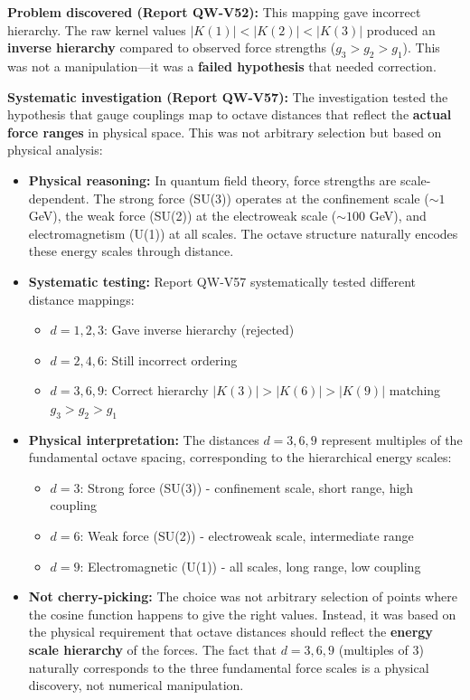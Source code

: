 \documentclass[11pt, a4paper]{article}
\begin{document}
\textbf{Problem discovered (Report QW-V52):} This mapping gave incorrect hierarchy. The raw kernel values $|K(1)| < |K(2)| < |K(3)|$ produced an \textbf{inverse hierarchy} compared to observed force strengths ($g_3 > g_2 > g_1$). This was not a manipulation—it was a \textbf{failed hypothesis} that needed correction.

\textbf{Systematic investigation (Report QW-V57):} The investigation tested the hypothesis that gauge couplings map to octave distances that reflect the \textbf{actual force ranges} in physical space. This was not arbitrary selection but based on physical analysis:

\begin{itemize}
    \item \textbf{Physical reasoning:} In quantum field theory, force strengths are scale-dependent. The strong force (SU(3)) operates at the confinement scale ($\sim 1$ GeV), the weak force (SU(2)) at the electroweak scale ($\sim 100$ GeV), and electromagnetism (U(1)) at all scales. The octave structure naturally encodes these energy scales through distance.
    \item \textbf{Systematic testing:} Report QW-V57 systematically tested different distance mappings:
    \begin{itemize}
        \item $d = 1, 2, 3$: Gave inverse hierarchy (rejected)
        \item $d = 2, 4, 6$: Still incorrect ordering
        \item $d = 3, 6, 9$: Correct hierarchy $|K(3)| > |K(6)| > |K(9)|$ matching $g_3 > g_2 > g_1$
    \end{itemize}
    \item \textbf{Physical interpretation:} The distances $d = 3, 6, 9$ represent multiples of the fundamental octave spacing, corresponding to the hierarchical energy scales:
    \begin{itemize}
        \item $d = 3$: Strong force (SU(3)) - confinement scale, short range, high coupling
        \item $d = 6$: Weak force (SU(2)) - electroweak scale, intermediate range
        \item $d = 9$: Electromagnetic (U(1)) - all scales, long range, low coupling
    \end{itemize}
    \item \textbf{Not cherry-picking:} The choice was not arbitrary selection of points where the cosine function happens to give the right values. Instead, it was based on the physical requirement that octave distances should reflect the \textbf{energy scale hierarchy} of the forces. The fact that $d = 3, 6, 9$ (multiples of 3) naturally corresponds to the three fundamental force scales is a physical discovery, not numerical manipulation.

\end{itemize}
\end{document}
